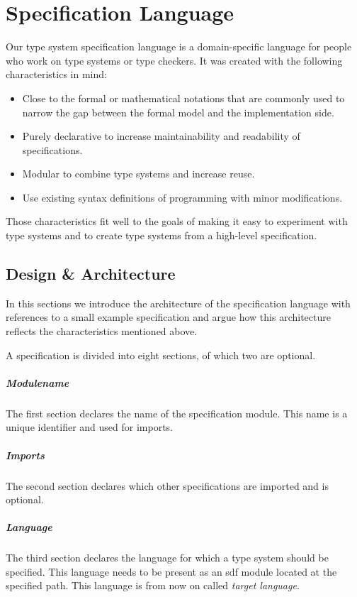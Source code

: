 \chapter{Specification Language}
\label{cha:spec-lang}
Our type system specification language is a domain-specific language
for people who work on type systems or type checkers. It was created
with the following characteristics in mind:

\begin{itemize}
\item Close to the formal or mathematical notations that are commonly
  used to narrow the gap between the formal model and the
  implementation side.
\item Purely declarative to increase maintainability and readability of
  specifications.
\item Modular to combine type systems and increase reuse.
\item Use existing syntax definitions of programming with minor
  modifications.
\end{itemize}

Those characteristics fit well to the goals of making it easy to
experiment with type systems and to create type systems from a
high-level specification.
\section{Design \& Architecture}
\label{sec:design--architecture}
In this sections we introduce the architecture of the specification
language with references to a small example specification and argue
how this architecture reflects the characteristics mentioned above.

A specification is divided into eight sections, of which two are
optional.

\paragraph{Modulename} The first section declares the name of the
specification module. This name is a unique identifier and used for
imports.

\paragraph{Imports} The second section declares which other
specifications are imported and is optional.

\paragraph{Language} The third section declares the language for which
a type system should be specified. This language needs to be present
as an \gls{sdf} module located at the specified path. This language is
from now on called \textit{target language}.

